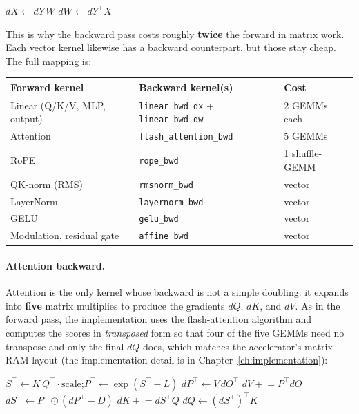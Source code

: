 \documentclass[11pt]{report}
\begin{document}
\begin{algorithm}[H]
\DontPrintSemicolon
{}
$dX \leftarrow dY\,W$ 
$dW \leftarrow dY^\top X$ 
\caption{Linear backward (two GEMMs per forward linear)}
\end{algorithm}

This is why the backward pass costs roughly \textbf{twice} the forward in
matrix work. Each vector kernel likewise has a backward counterpart, but
those stay cheap. The full mapping is:

\begin{center}
\begin{tabular}{@{}lll@{}}
\toprule
Forward kernel & Backward kernel(s) & Cost \\
\midrule
Linear (Q/K/V, MLP, output) & \texttt{linear\_bwd\_dx} + \texttt{linear\_bwd\_dw} & 2 GEMMs each \\
Attention & \texttt{flash\_attention\_bwd} & 5 GEMMs \\
RoPE & \texttt{rope\_bwd} & 1 shuffle-GEMM \\
QK-norm (RMS) & \texttt{rmsnorm\_bwd} & vector \\
LayerNorm & \texttt{layernorm\_bwd} & vector \\
GELU & \texttt{gelu\_bwd} & vector \\
Modulation, residual gate & \texttt{affine\_bwd} & vector \\
\bottomrule
\end{tabular}
\end{center}

\paragraph{Attention backward.} Attention is the only kernel whose
backward is not a simple doubling: it expands into \textbf{five} matrix
multiplies to produce the gradients $dQ$, $dK$, and $dV$. As in the
forward pass, the implementation uses the flash-attention algorithm and
computes the scores in \emph{transposed} form so that four of the five
GEMMs need no transpose and only the final $dQ$ does, which matches the
accelerator's matrix-RAM layout (the implementation detail is in
Chapter~\ref{ch:implementation}):

\begin{algorithm}[H]
\DontPrintSemicolon
{}
$S^\top \leftarrow K\,Q^\top \cdot \text{scale}$;\quad $P^\top \leftarrow \exp(S^\top - L)$\;
$dP^\top \leftarrow V\,dO^\top$\;
$dV \mathrel{+}= P^\top dO$ 
$dS^\top \leftarrow P^\top \odot (dP^\top - D)$\;
$dK \mathrel{+}= dS^\top Q$ 
$dQ \leftarrow (dS^\top)^\top K$ 
\caption{Attention backward (five head-fused GEMMs)}
\end{algorithm}
\end{document}
